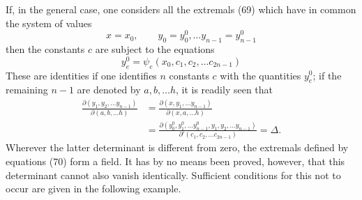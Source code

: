 \documentclass[11pt,a4paper,leqno]{article}
\begin{document}
If, in the general case, one considers all the extremals (69)
which have in common the system of values
\[
x=x_0,\qquad y_0=y_0^0,\ldots y_{n-1}=y_{n-1}^0
\]
then the constants $c$ are subject to the equations
\begin{equation}\tag{70}
y_e^0=\psi_e(x_0,c_1,c_2,\ldots c_{2n-1})
\end{equation}
These are identities if one identifies $n$ constants $c$
with the quantities $y_e^0$; if the remaining
$n-1$ are denoted by $a,b,\ldots h$, it is readily seen that
\[
\begin{aligned}
\frac{\partial(y_1,y_2,\ldots y_{n-1})}{\partial(a,b,\ldots h)}
&=\frac{\partial(x,y_1,\ldots y_{n-1})}{\partial(x,a,\ldots h)}\\
&=\frac{\partial(y_0^0,y_1^0,\ldots y_{n-1}^0,y_1,y_2,\ldots y_{n-1})}
{\partial'(c_1,c_2,\ldots c_{2n-1})}=\Delta.
\end{aligned}
\]
Wherever the latter determinant is different from zero,
the extremals defined by equations (70) form a field.
It has by no means been proved, however, that this determinant
cannot also vanish identically. Sufficient conditions
for this not to occur are given in the following example.
\end{document}
